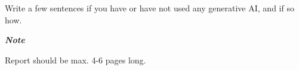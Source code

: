 \documentclass[a4paper,10pt]{article}
\begin{document}
Write a few sentences if you have or have not used any generative AI, and if so how.


\hfill \break
\textit{\textbf{Note}}

Report should be max. 4-6 pages long.

	
\begin{thebibliography}{1}

		
\end{thebibliography}

	
	
%	
%	
%	
\end{document}
